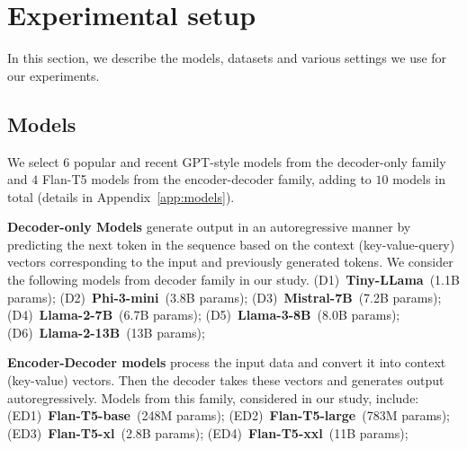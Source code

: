 

\section{Experimental setup}

In this section, we describe the models, datasets and various settings we use for our experiments.


\subsection{Models}
\label{sub:models}

We select $6$ popular and recent GPT-style models from the decoder-only family and $4$ Flan-T5 models from the encoder-decoder family, adding to $10$ models in total 
(details in Appendix~\ref{app:models}).


\noindent \textbf{Decoder-only Models} generate output in an autoregressive manner by predicting the next token in the sequence based on the context (key-value-query) vectors corresponding to the input and previously generated tokens. 
We consider the following models from decoder family in our study. 
(D1)~\textbf{Tiny-LLama}~(1.1B params);
(D2)~\textbf{Phi-3-mini}~(3.8B params);
(D3)~\textbf{Mistral-7B}~(7.2B params);
(D4)~\textbf{Llama-2-7B}~(6.7B params);
(D5)~\textbf{Llama-3-8B}~(8.0B params);
(D6)~\textbf{Llama-2-13B}~(13B params); 


\noindent \textbf{Encoder-Decoder models} process the input data and convert it into context (key-value) vectors. Then the decoder takes these vectors and generates output autoregressively. Models from this family, considered in our study, include: 
%
(ED1)~\textbf{Flan-T5-base}~(248M params); 
(ED2)~\textbf{Flan-T5-large}~(783M params);
(ED3)~\textbf{Flan-T5-xl}~(2.8B params);
(ED4)~\textbf{Flan-T5-xxl}~(11B params);





